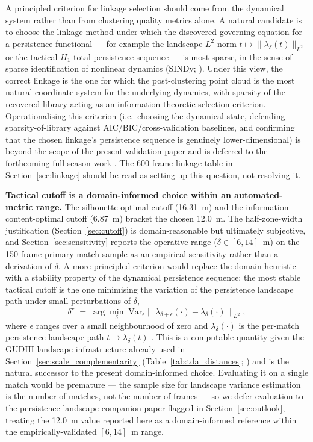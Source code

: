 A principled criterion for linkage selection should come from the dynamical system rather than from clustering quality metrics alone. A natural candidate is to choose the linkage method under which the discovered governing equation for a persistence functional --- for example the landscape \(L^2\) norm \(t \mapsto \|\lambda_\delta(t)\|_{L^2}\) or the tactical \(H_1\) total-persistence sequence --- is most sparse, in the sense of sparse identification of nonlinear dynamics (SINDy; \citealp{Brunton2016}). Under this view, the correct linkage is the one for which the post-clustering point cloud is the most natural coordinate system for the underlying dynamics, with sparsity of the recovered library acting as an information-theoretic selection criterion. Operationalising this criterion (i.e.\ choosing the dynamical state, defending sparsity-of-library against AIC/BIC/cross-validation baselines, and confirming that the chosen linkage's persistence sequence is genuinely lower-dimensional) is beyond the scope of the present validation paper and is deferred to the forthcoming full-season work \citep{Brown2026inprep}. The 600-frame linkage table in Section~\ref{sec:linkage} should be read as setting up this question, not resolving it.

\textbf{Tactical cutoff is a domain-informed choice within an automated-metric range.} The silhouette-optimal cutoff (16.31~m) and the information-content-optimal cutoff (6.87~m) bracket the chosen 12.0~m. The half-zone-width justification (Section~\ref{sec:cutoff}) is domain-reasonable but ultimately subjective, and Section~\ref{sec:sensitivity} reports the operative range (\(\delta \in [6, 14]\)~m) on the 150-frame primary-match sample as an empirical sensitivity rather than a derivation of \(\delta\). A more principled criterion would replace the domain heuristic with a stability property of the dynamical persistence sequence: the most stable tactical cutoff is the one minimising the variation of the persistence landscape path under small perturbations of \(\delta\),
\begin{equation}
  \delta^{\star} \;=\; \arg\min_{\delta}\;
    \mathrm{Var}_{\epsilon}\bigl\|\,\lambda_{\delta+\epsilon}(\cdot) - \lambda_{\delta}(\cdot)\,\bigr\|_{L^{2}},
  \label{eq:landscape_stability_criterion}
\end{equation}
where \(\epsilon\) ranges over a small neighbourhood of zero and \(\lambda_\delta(\cdot)\) is the per-match persistence landscape path \(t\mapsto\lambda_\delta(t)\) \citep{Bubenik2015}. This is a computable quantity given the GUDHI landscape infrastructure already used in Section~\ref{sec:scale_complementarity} (Table~\ref{tab:tda_distances}; \citealp{Tauzin2021}) and is the natural successor to the present domain-informed choice. Evaluating it on a single match would be premature --- the sample size for landscape variance estimation is the number of matches, not the number of frames --- so we defer evaluation to the persistence-landscape companion paper flagged in Section~\ref{sec:outlook}, treating the 12.0~m value reported here as a domain-informed reference within the empirically-validated \([6, 14]\)~m range.

